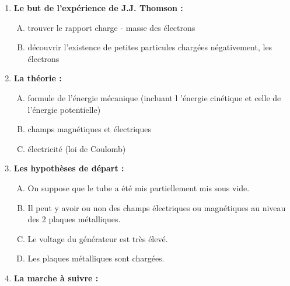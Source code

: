 \documentclass[../main.tex]{subfiles}
\begin{document}
\begin{enumerate}[I]
    \item \textbf{Le but de l'expérience de J.J. Thomson :}
    \begin{enumerate}[A.]
        \item trouver le rapport charge - masse des électrons
        \item découvrir l'existence de petites particules chargées négativement, les électrons
    \end{enumerate}
    \item \textbf {La théorie :}
    \begin{enumerate}[A.]
        \item formule de l'énergie mécanique (incluant l 'énergie cinétique et celle de l'énergie potentielle)
        \item champs magnétiques et électriques
        \item électricité (loi de Coulomb) 
    \end{enumerate}
    \item \textbf {Les hypothèses de départ :}
    \begin{enumerate}[A.]
        \item On suppose que le tube a été mis partiellement mis sous vide.
        \item Il peut y avoir ou non des champs électriques ou magnétiques au niveau des 2 plaques métalliques.
        \item Le voltage du générateur est très élevé.
        \item Les plaques métalliques sont chargées.
    \end{enumerate}
    \item \textbf{La marche à suivre :}
    

\end{enumerate}
\end{document}

